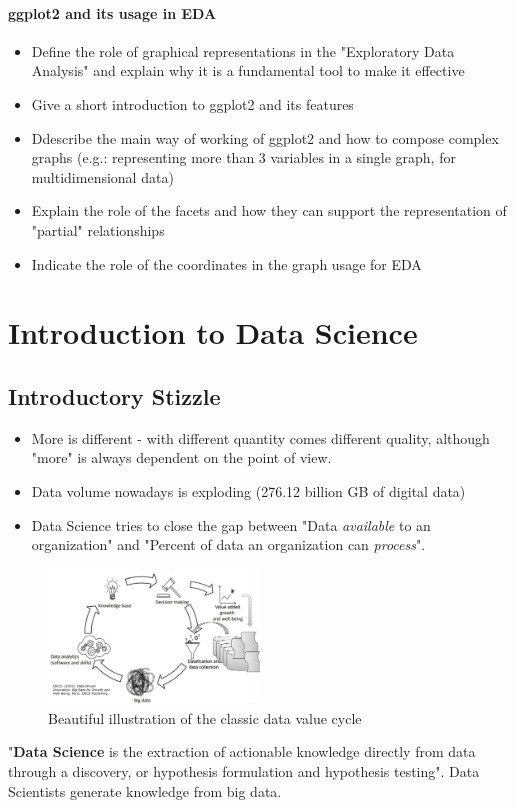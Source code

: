 \documentclass[a4paper]{article}
\begin{document}
		\paragraph{ggplot2 and its usage in EDA}
		
			\begin{itemize}
				\item Define the role of graphical representations in the "Exploratory Data Analysis" and explain why it is a fundamental tool to make it effective
				\item Give a short introduction to ggplot2 and its features
				\item Ddescribe the main way of working of ggplot2 and how to compose complex graphs (e.g.: representing more than 3 variables in a single graph, for multidimensional data)
				\item Explain the role of the facets and how they can support the representation of "partial" relationships
				\item Indicate the role of the coordinates in the graph usage for EDA
			\end{itemize}
		
		
	\newpage
	
	\section{Introduction to Data Science}
	
		\subsection{Introductory Stizzle}
		
		\begin{itemize}
			\item More is different - with different quantity comes different quality, although "more" is always dependent on the point of view.
			\item Data volume nowadays is exploding (276.12 billion GB of digital data)
			\item Data Science tries to close the gap between "Data \textit{available} to an organization" and "Percent of data an organization can \textit{process}".
		\end{itemize}
	
		\begin{figure}[htb!]
			\centering
			\includegraphics[width=0.5\textwidth]{img/sw01/data_value_cycle.png}
			\caption{Beautiful illustration of the classic data value cycle}
		\end{figure}
	\noindent
		"\textbf{Data Science} is the extraction of actionable knowledge directly from data through a discovery, or hypothesis formulation and hypothesis testing".
		Data Scientists generate knowledge from big data.
		
\end{document}
